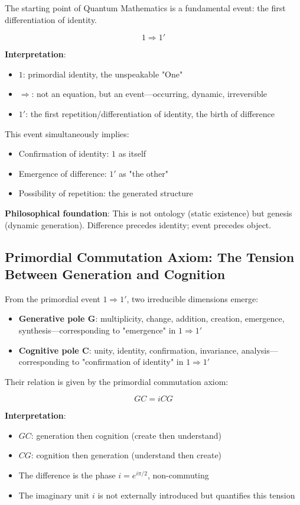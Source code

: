 \documentclass[12pt]{article}
\theoremstyle{definition}
\begin{document}
The starting point of Quantum Mathematics is a fundamental event: the first differentiation of identity.

\[
\boxed{1 \Rightarrow 1'}
\]

\textbf{Interpretation}:
\begin{itemize}
    \item \(1\): primordial identity, the unspeakable "One"
    \item \(\Rightarrow\): not an equation, but an event—occurring, dynamic, irreversible
    \item \(1'\): the first repetition/differentiation of identity, the birth of difference
\end{itemize}

This event simultaneously implies:
\begin{itemize}
    \item Confirmation of identity: \(1\) as itself
    \item Emergence of difference: \(1'\) as "the other"
    \item Possibility of repetition: the generated structure
\end{itemize}

\textbf{Philosophical foundation}: This is not ontology (static existence) but genesis (dynamic generation). Difference precedes identity; event precedes object.

\subsection{Primordial Commutation Axiom: The Tension Between Generation and Cognition}

From the primordial event \(1 \Rightarrow 1'\), two irreducible dimensions emerge:
\begin{itemize}
    \item \textbf{Generative pole G}: multiplicity, change, addition, creation, emergence, synthesis—corresponding to "emergence" in \(1 \Rightarrow 1'\)
    \item \textbf{Cognitive pole C}: unity, identity, confirmation, invariance, analysis—corresponding to "confirmation of identity" in \(1 \Rightarrow 1'\)
\end{itemize}

Their relation is given by the primordial commutation axiom:

\[
\boxed{GC = iCG}
\]

\textbf{Interpretation}:
\begin{itemize}
    \item \(GC\): generation then cognition (create then understand)
    \item \(CG\): cognition then generation (understand then create)
    \item The difference is the phase \(i = e^{i\pi/2}\), non-commuting
    \item The imaginary unit \(i\) is not externally introduced but quantifies this tension
\end{itemize}
\end{document}

